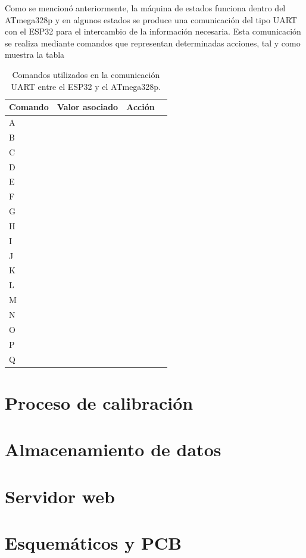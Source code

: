 Como se mencionó anteriormente, la máquina de estados funciona dentro del ATmega328p y en algunos estados se produce una comunicación del tipo UART con el ESP32 para el intercambio de la información necesaria. Esta comunicación se realiza mediante comandos que representan determinadas acciones, tal y como muestra la tabla


\begin{table}[h]
	\centering
	\caption[Comandos UART]{Comandos utilizados en la comunicación UART entre el ESP32 y el ATmega328p.}
	\begin{tabular}{l c c c }    
		\toprule
		\textbf{Comando} & \textbf{Valor asociado}	&    \textbf{Acción } \\
		\midrule
		A	&  &  		 \\
		B	&  &  		 \\		
		C	&  &  		 \\	
		D	&  &  		 \\	
		E	&  &  		 \\	
		F	&  &  		 \\		
		G	&  &  		 \\	
		H	&  &  		 \\	
		I	&  &  		 \\	
		J	&  &  		 \\		
		K	&  &  		 \\	
		L	&  &  		 \\	
		M	&  &  		 \\	
		N	&  &  		 \\		
		O	&  &  		 \\	
		P	&  &  		 \\	
		Q	&  &  		 \\	
		\bottomrule
		\hline
	\end{tabular}
	\label{tab:titComerciales}
\end{table}


\section{Proceso de calibración}

\section{Almacenamiento de datos}

\section{Servidor web}

\section{Esquemáticos y PCB}
